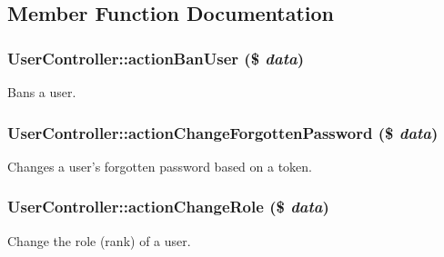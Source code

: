 \subsection{Member Function Documentation}
\hypertarget{classUserController_a3e41d7a8100c0a094330227a872b100a}{
\subsubsection[{actionBanUser}]{\setlength{\rightskip}{0pt plus 5cm}UserController::actionBanUser (\$ {\em data})}}
\label{classUserController_a3e41d7a8100c0a094330227a872b100a}
Bans a user. \hypertarget{classUserController_ad0a71c9656f67576fc07b7b58b94640e}{
\subsubsection[{actionChangeForgottenPassword}]{\setlength{\rightskip}{0pt plus 5cm}UserController::actionChangeForgottenPassword (\$ {\em data})}}
\label{classUserController_ad0a71c9656f67576fc07b7b58b94640e}
Changes a user's forgotten password based on a token. \hypertarget{classUserController_ab1b1338f5cbaaaa66a8f8e2f56029b14}{
\subsubsection[{actionChangeRole}]{\setlength{\rightskip}{0pt plus 5cm}UserController::actionChangeRole (\$ {\em data})}}
\label{classUserController_ab1b1338f5cbaaaa66a8f8e2f56029b14}
Change the role (rank) of a user.


